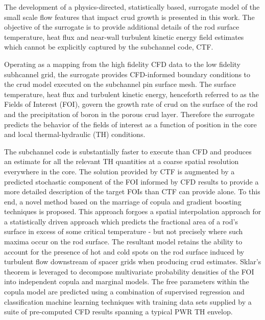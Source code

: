 
\utabstract
{}%
\indent
The development of a physics-directed, statistically based,
surrogate model of the small scale flow features that impact crud growth is presented in this work. 
The objective of the surrogate is to provide additional details of the rod surface temperature, heat
flux and near-wall turbulent kinetic energy field estimates which cannot be explicitly captured by the subchannel code, CTF. 

Operating as a mapping from the high fidelity CFD data to the low fidelity subhcannel grid, the surrogate provides CFD-informed boundary conditions to the crud model executed on the subchannel pin surface mesh. The surface temperature, heat
flux and turbulent kinetic energy, henceforth referred to as the Fields of Interest (FOI),
govern the growth rate of crud on the surface of the rod and the
precipitation of boron in the porous crud layer. Therefore the surrogate predicts the behavior of the
fields of interest as a function of position in the core and local thermal-hydraulic (TH) conditions.

The subchannel code is substantially faster to execute than CFD
and produces an estimate for all the relevant TH quantities at a coarse spatial resolution everywhere in
the core.  The solution provided by CTF is augmented by a predicted stochastic
component of the FOI informed by CFD results to provide a more detailed description of the target
FOIs than CTF can provide alone.  To this end, a novel method based on the marriage of copula and
gradient boosting techniques is proposed. This approach forgoes a spatial interpolation approach
for a statistically driven approach which predicts the fractional area of a rod’s surface in excess of some
critical temperature - but not precisely where such maxima occur on the rod surface.
The resultant model retains the ability to account for the presence
of hot and cold spots on the rod surface induced by turbulent flow downstream of spacer grids when
producing crud estimates. Sklar’s theorem is leveraged to decompose multivariate probability densities
of the FOI into independent copula and marginal models. The free parameters within the copula model
are predicted using a combination of supervised regression and classification machine learning techniques
with training data sets supplied by a suite of pre-computed CFD results spanning a typical PWR TH
envelop.